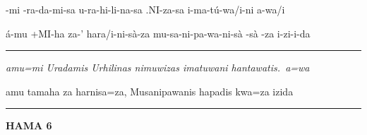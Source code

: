 \setcounter{parcount}{0}
\begin{parnumbersa}[]
	\raggedright%
	\itshape%

	-mi
	-ra-da-mi-sa
	u-ra-hi-li-na-sa
	.NI-za-sa
	i-ma-tú-wa/i-ni
	a-wa/i

	á-mu +MI-ha za-' hara/i-ni-sà-za
	mu-sa-ni-pa-wa-ni-sà
	-sà
	-za i-zi-i-da



\end{parnumbersa}

\vspace{5pt}
\hrule
\vspace{5pt}

\setcounter{parcount}{0}
\begin{parnumbersa}[]
	\raggedright%
	\itshape%
	amu=mi Uradamis Urhilinas nimuwizas imatuwani hantawatis.\ a=wa

	amu tamaha za harnisa=za, Musanipawanis hapadis kwa=za izida

\end{parnumbersa}

\vspace{5pt}
\hrule
\vspace{20pt}

\sloppybottom%
\clearpage

\noindent \textbf{HAMA 6}
\vspace{5pt}

\setcounter{parcount}{0}
\begin{parnumbersa}[]
	\raggedright%
	\itshape%

	\large {}\hspace{5pt}
	\hspace{5pt}
	\hspace{5pt}
	\hspace{5pt}
	\hspace{5pt}
	\hspace{5pt}
	\hspace{5pt}

	\large {}\hspace{5pt}
	\hspace{5pt}
	\hspace{5pt}
	\hspace{5pt}
	\hspace{5pt}
	\hspace{5pt}


\end{parnumbersa}

